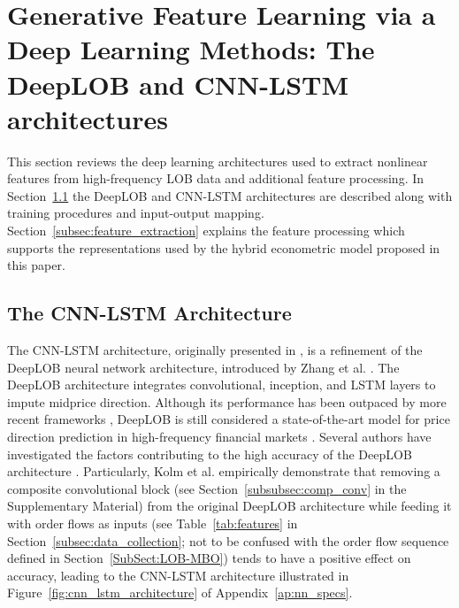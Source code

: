 \documentclass[10pt,a4paper,oneside]{article}
\providecommand{\DIFdeltex}[1]{{\protect\color{red} \scriptsize #1}} %
\providecommand{\DIFdelbegin}{} %
\providecommand{\DIFdelend}{} %
\providecommand{\DIFdel}[1]{\texorpdfstring{\DIFdeltex{#1}}{}} %
\newcommand{\DIFscaledelfig}{0.5}
\newlength{\DIFdelgraphicswidth} %
\newlength{\DIFdelgraphicsheight} %
\newcommand{\DIFdelincludegraphics}[2][]{%
\sbox{\DIFdelgraphicsbox}{\DIFOincludegraphics[#1]{#2}}%
\settoboxwidth{\DIFdelgraphicswidth}{\DIFdelgraphicsbox} %
\settoboxtotalheight{\DIFdelgraphicsheight}{\DIFdelgraphicsbox} %
\scalebox{\DIFscaledelfig}{%
\parbox[b]{\DIFdelgraphicswidth}{\usebox{\DIFdelgraphicsbox}\\[-\baselineskip] \rule{\DIFdelgraphicswidth}{0em}}\llap{\resizebox{\DIFdelgraphicswidth}{\DIFdelgraphicsheight}{%
\setlength{\unitlength}{\DIFdelgraphicswidth}%
\begin{picture}(1,1)%
\thicklines\linethickness{2pt} %
{\color[rgb]{1,0,0}\put(0,0){\framebox(1,1){}}}%
{\color[rgb]{1,0,0}\put(0,0){\line( 1,1){1}}}%
{\color[rgb]{1,0,0}\put(0,1){\line(1,-1){1}}}%
\end{picture}%
}\hspace*{3pt}}} %
} %
\DeclareRobustCommand{\DIFdelbegin}{\DIFOdelbegin \let\includegraphics\DIFdelincludegraphics} %
\DeclareRobustCommand{\DIFdelend}{\DIFOaddend \let\includegraphics\DIFOincludegraphics} %
\begin{document}
\section{Generative Feature Learning via \DIFdelbegin \DIFdel{a }\DIFdelend Deep Learning Methods: The DeepLOB and CNN-LSTM architectures}
\label{Sect:Features}
This section reviews the deep learning architectures used to extract nonlinear features from high-frequency LOB data and additional feature processing. In Section~\ref{subsec:cnn_lstm} the DeepLOB \cite{zhang2021deeplearningmarketorder} and CNN-LSTM architectures \cite{kolm2023deep} are described along with training procedures and input-output mapping. Section~\ref{subsec:feature_extraction} explains the feature processing which supports the representations used by the hybrid econometric model proposed in this paper.
\subsection{The CNN-LSTM Architecture}
\label{subsec:cnn_lstm}
The CNN-LSTM architecture, originally presented in \cite{kolm2023deep}, is a refinement of the DeepLOB neural network architecture, introduced by Zhang et al. \cite{Zhang_2019}. The DeepLOB architecture integrates convolutional, inception, and LSTM layers to impute midprice direction. Although its performance has been outpaced by more recent frameworks \cite{prata2024lob}, DeepLOB is still considered a state-of-the-art model for price direction prediction in high-frequency financial markets \cite{briola2024deep, kolm2023deep}. Several authors have investigated the factors contributing to the high accuracy of the DeepLOB architecture \cite{kolm2023deep, kolm2024improving, briola2024deep}. Particularly, Kolm et al. \cite{kolm2023deep} empirically demonstrate that removing a composite convolutional block (see Section~\ref{subsubsec:comp_conv} in the Supplementary Material) from the original DeepLOB architecture while feeding it with order flows as inputs (see Table~\ref{tab:features} in Section~\ref{subsec:data_collection}; not to be confused with the order flow sequence defined in Section~\ref{SubSect:LOB-MBO}) tends to have a positive effect on accuracy, leading to the CNN-LSTM architecture illustrated in Figure~\ref{fig:cnn_lstm_architecture} of Appendix~\ref{ap:nn_specs}.
\end{document}
